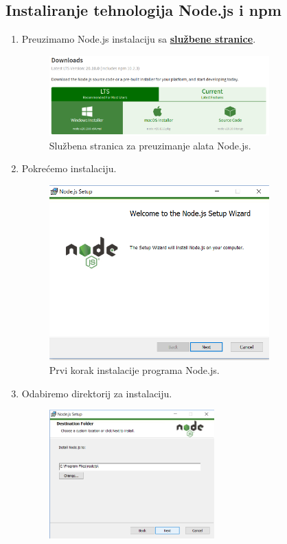 		\subsection*{Instaliranje tehnologija Node.js i npm}
		\begin{enumerate}
			\item Preuzimamo Node.js instalaciju sa \textbf{\href{https://nodejs.org/en/download/}{službene stranice}}.
			\begin{figure}[h]
				\centering
				\includegraphics[width=0.8\textwidth]{slike/npm_install/0.png}
				\caption{Službena stranica za preuzimanje alata Node.js.}
				\label{fig:node_install_images}
			\end{figure}
			\item Pokrećemo instalaciju.
			\begin{figure}[h]
				\centering
				\includegraphics[width=0.8\textwidth]{slike/npm_install/1.png}
				\caption{Prvi korak instalacije programa Node.js.}
				\label{fig:node_install_images}
			\end{figure}
			\eject
			\item Odabiremo direktorij za instalaciju.
			\begin{figure}[h]
				\centering
				\includegraphics[width=0.6\textwidth]{slike/npm_install/2.png}

\end{figure}
\end{enumerate}
